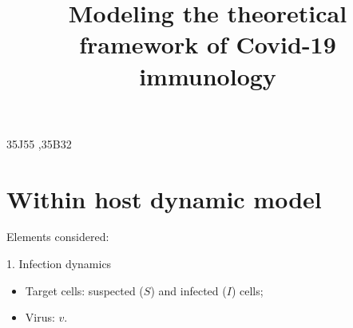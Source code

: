 \documentclass[preprint,11pt,sort&compress,square]{elsarticle}
\numberwithin{equation}{section}
\begin{document}
\linenumbers
\begin{frontmatter}

	\title{Modeling the theoretical framework of Covid-19 immunology}
	\begin{comment}
	\tnotetext[mytitlenote]{Research partially supported by the China Scholarship Council (PS), NSF grant DMS-1411476 (YL), NSFC grants  11631012 and 11571273 (YX), and   National Mega-project of Science Research  2017ZX10201101-002-002 (YX)}

	\author[XiaoSongaddress]{Shuangshuang Yin}



	\author[Louaddress2]{Yuan Lou}

	\ead{lou@math.ohio-state.edu}

	\author[Wuaddress]{Jianhong Wu}

	\ead{wu@math.ohio-state.edu}


	\author[XiaoSongaddress]{Yanni Xiao\corref{mycorrespondingauthor}}
	\cortext[mycorrespondingauthor]{Corresponding author}
	\ead{yxiao@mail.xjtu.edu.cn}

	\author[XiaoSongaddress]{Pengfei Song}
	\ead{song921012@stu.xjtu.edu.cn}

	\address[XiaoSongaddress]{School of Mathematics and Statistics, Xi'an Jiaotong University, Xi'an, ShaanXi, 710049, PRC}
	\address[Louaddress2]{Department of Mathematics, Ohio State University, Columbus, OH 43210, USA}

	\address[Wuaddress]{Department of Mathematics, York University, Canada}
	\end{comment}
	\begin{abstract}

	\end{abstract}

	\begin{keyword}

		\MSC[2010] 35J55 \sep  35B32
	\end{keyword}

\end{frontmatter}

\linenumbers
\section{Within host dynamic model}
Elements considered:

1. Infection dynamics
\begin{itemize}
	\item Target cells:        suspected ($S$) and infected ($I$) cells;
	\item Virus:    $v$.
\end{itemize}
\end{document}
